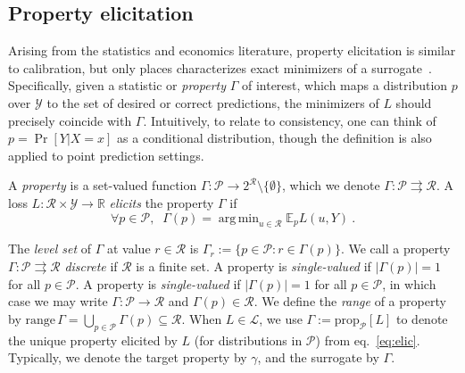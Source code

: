 \documentclass[anon,12pt]{colt2021} %
\newcommand{\reals}{\mathbb{R}}
\newcommand{\simplex}{\Delta_\Y}
\newcommand{\prop}[2][\mathcal{P}]{\mathrm{prop}_{#1}[#2]}
\newcommand{\range}{\mathrm{range}\,}
\newcommand{\E}{\mathbb{E}}
\renewcommand{\L}{\mathcal{L}}
\newcommand{\R}{\mathcal{R}}
\renewcommand{\P}{\mathcal{P}}
\newcommand{\Y}{\mathcal{Y}}
\newcommand{\exploss}[3]{\E_{#3} #1(#2,Y)}
\newcommand{\toto}{\rightrightarrows}
\DeclareMathOperator*{\argmin}{arg\,min}
\begin{document}






\subsection{Property elicitation}\label{subsec:properties}
Arising from the statistics and economics literature, property elicitation is similar to calibration, but only places characterizes exact minimizers of a surrogate~\citep{savage1971elicitation,osband1985information-eliciting,lambert2008eliciting,lambert2009eliciting,lambert2018elicitation,frongillo2015vector-valued,frongillo2014general}.
Specifically, given a statistic or \emph{property} $\Gamma$ of interest, which maps a distribution $p$ over $\Y$ to the set of desired or correct predictions, the minimizers of $L$ should precisely coincide with $\Gamma$.
Intuitively, to relate to consistency, one can think of $p = \Pr[Y|X=x]$ as a conditional distribution, though the definition is also applied to point prediction settings.

\begin{definition}
	A \emph{property} is a set-valued function $\Gamma : \P \to 2^\R \setminus \{\emptyset\}$, which we denote $\Gamma: \P \toto \R$.
	A loss $L : \R \times \Y \to \reals$ \emph{elicits} the property $\Gamma$ if
	\begin{equation}
    \label{eq:elic}    
    \forall p \in \P, \;\; \Gamma(p) = \argmin_{u \in \R} \exploss{L}{u}{p}~.
	\end{equation}
\end{definition}

The \emph{level set} of $\Gamma$ at value $r\in\R$ is $\Gamma_r := \{p \in \P : r \in \Gamma(p)\}$.
We call a property $\Gamma: \P \toto \R$ \emph{discrete} if $\R$ is a finite set.
A property is \emph{single-valued} if $|\Gamma(p)| = 1$ for all $p\in\P$.
A property is \emph{single-valued} if $|\Gamma(p)|=1$ for all $p\in\P$, in which case we may write $\Gamma:\P\to\R$ and $\Gamma(p) \in \R$.
We define the \emph{range} of a property by $\range \Gamma = \bigcup_{p\in\P} \Gamma(p) \subseteq \R$.
When $L\in\L$, we use $\Gamma := \prop[\P]{L}$ to denote the unique property elicited by $L$ (for distributions in $\P$) from eq.~\eqref{eq:elic}. 
Typically, we denote the target property by $\gamma$, and the surrogate by $\Gamma$.
\end{document}
